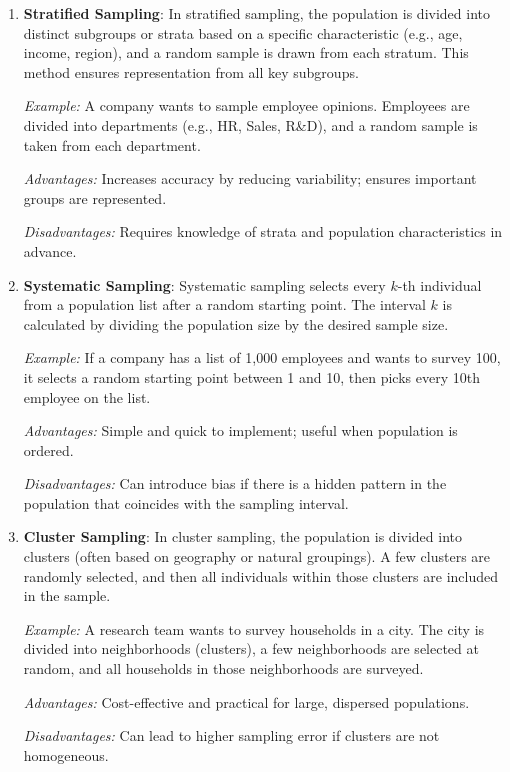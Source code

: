 \documentclass[twoside]{book}
\begin{document}
\begin{enumerate}
    \item \textbf{Stratified Sampling}: In stratified sampling, the population is divided into distinct subgroups or strata based on a specific characteristic (e.g., age, income, region), and a random sample is drawn from each stratum. This method ensures representation from all key subgroups.

\textit{Example:} A company wants to sample employee opinions. Employees are divided into departments (e.g., HR, Sales, R\&D), and a random sample is taken from each department.

\textit{Advantages:} Increases accuracy by reducing variability; ensures important groups are represented.  

\textit{Disadvantages:} Requires knowledge of strata and population characteristics in advance.

\item \textbf{Systematic Sampling}: Systematic sampling selects every $k$-th individual from a population list after a random starting point. The interval $k$ is calculated by dividing the population size by the desired sample size.

\textit{Example:} If a company has a list of 1,000 employees and wants to survey 100, it selects a random starting point between 1 and 10, then picks every 10th employee on the list.

\textit{Advantages:} Simple and quick to implement; useful when population is ordered.  

\textit{Disadvantages:} Can introduce bias if there is a hidden pattern in the population that coincides with the sampling interval.

\item \textbf{Cluster Sampling}: In cluster sampling, the population is divided into clusters (often based on geography or natural groupings). A few clusters are randomly selected, and then all individuals within those clusters are included in the sample.

\textit{Example:} A research team wants to survey households in a city. The city is divided into neighborhoods (clusters), a few neighborhoods are selected at random, and all households in those neighborhoods are surveyed.

\textit{Advantages:} Cost-effective and practical for large, dispersed populations.  

\textit{Disadvantages:} Can lead to higher sampling error if clusters are not homogeneous.


\end{enumerate}
\end{document}
